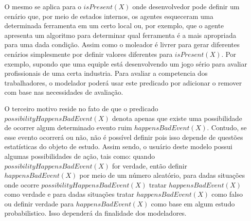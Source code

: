 O mesmo se aplica para o $isPresent(X)$ onde desenvolvedor pode definir um cenário que, por meio de 
estados internos, os agentes esqueceram uma determinada ferramenta em um certo local ou, por exemplo, que o agente apresenta um 
algoritmo para determinar qual ferramenta é a mais apropriada para uma dada condição. Assim como o moleador é livrer para 
gerar diferentes cenários simplesmente por definir valores diferentes para $isPresent(X)$. Por exemplo, supondo que uma equiple está 
desenvolvendo um jogo sério para avaliar profissionais de uma certa industria. Para avaliar a competencia dos trabalhadores, o 
modelador poderá usar este predicado por adicionar o remover com base nas necessidades de avaliação.

O terceiro motivo reside no fato de que o predicado $possibilityHappensBadEvent(X)$ denota apenas que existe uma possibilidade de ocorrer 
algum determinado evento ruim  $happensBadEvent(X)$. Contudo, se esse evento ocorrerá ou não, não é 
possível definir pois isso depende de questões estatísticas do objeto de estudo. Assim sendo, o usuário deste 
modelo possui algumas possibilidades de ação, tais como: quando $possibilityHappensBadEvent(X)$  for verdade, 
então definir $happensBadEvent(X)$ por meio de um número aleatório, para dadas situações onde ocorre 
$possibilityHappensBadEvent(X)$ tratar $happensBadEvent(X)$ como verdade e para dadas situações 
tratar $happensBadEvent(X)$ como falso ou definir verdade para $happensBadEvent(X)$ como base em algum estudo 
probabilistico. Isso dependerá da finalidade dos modeladores. 
